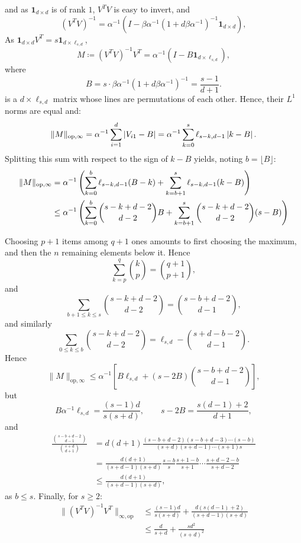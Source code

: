 \documentclass[oneside,UKenglish,a4paper]{amsart}
\numberwithin{equation}{section}
\numberwithin{figure}{section}
\theoremstyle{plain}
\theoremstyle{definition}
\theoremstyle{plain}
\theoremstyle{remark}
\theoremstyle{plain}
\theoremstyle{definition}
\theoremstyle{definition}
\begin{document}
and as $\mathbf{1}_{d\times d}$ is of rank $1$, $V^{T}V$ is easy
to invert, and
\[
(V^{T}V)^{-1}=\alpha^{-1}\left(I-\beta\alpha^{-1}(1+d\beta\alpha^{-1})^{-1}\mathbf{1}_{d\times d}\right),
\]
As $\mathbf{1}_{d\times d}V^{T}=s\mathbf{1}_{d\times\ell_{s,d}}$,
\[
M\coloneqq(V^{T}V)^{-1}V^{T}=\alpha^{-1}\left(I-B\mathbf{1}_{d\times\ell_{s,d}}\right),
\]
where
\[
B=s\cdot\beta\alpha^{-1}(1+d\beta\alpha^{-1})^{-1}=\frac{s-1}{d+1}.
\]
is a $d\times\ell_{s,d}$ matrix whose lines are permutations of each
other. Hence, their $L^{1}$ norms are equal and:
\[
\lVert M\rVert_{\text{op,\ensuremath{\infty}}}=\alpha^{-1}\sum_{i=1}^{d}\left|V_{i1}-B\right|=\alpha^{-1}\sum_{k=0}^{s}\ell_{s-k,d-1}\left|k-B\right|.
\]
Splitting this sum with respect to the sign of $k-B$ yields, noting
$b=\lfloor B\rfloor$:
\begin{align*}
\lVert M\rVert_{\text{op,\ensuremath{\infty}}} & =\alpha^{-1}\left(\sum_{k=0}^{b}\ell_{s-k,d-1}(B-k)+\sum_{k=b+1}^{s}\ell_{s-k,d-1}(k-B)\right)\\
 & \le\alpha^{-1}\left(\sum_{k=0}^{b}\binom{s-k+d-2}{d-2}B+\sum_{k=b+1}^{s}\binom{s-k+d-2}{d-2}(s-B)\right)
\end{align*}

Choosing $p+1$ items among $q+1$ ones amounts to first choosing
the maximum, and then the $n$ remaining elements below it. Hence
\[
\sum_{k=p}^{q}\binom{k}{p}=\binom{q+1}{p+1},
\]
and 
\[
\sum_{b+1\le k\le s}\binom{s-k+d-2}{d-2}=\binom{s-b+d-2}{d-1},
\]
and similarly
\[
\sum_{0\le k\le b}\binom{s-k+d-2}{d-2}=\ell_{s,d}-\binom{s+d-b-2}{d-1}.
\]
Hence
\[
\lVert M\rVert_{\text{op},\infty}\le\alpha^{-1}\left[B\ell_{s,d}+(s-2B)\binom{s-b+d-2}{d-1}\right],
\]
but
\[
B\alpha^{-1}\ell_{s,d}=\frac{(s-1)d}{s(s+d)},\qquad s-2B=\frac{s(d-1)+2}{d+1},
\]
and
\begin{align*}
\frac{\binom{s-b+d-2}{d-1}}{\binom{s+d}{d+1}} & =d(d+1)\frac{(s-b+d-2)(s-b+d-3)\cdots(s-b)}{(s+d)(s+d-1)\cdots(s+1)s}\\
 & =\frac{d(d+1)}{(s+d-1)(s+d)}\frac{s-b}{s}\frac{s+1-b}{s+1}\cdots\frac{s+d-2-b}{s+d-2}\\
 & \le\frac{d(d+1)}{(s+d-1)(s+d)},
\end{align*}
as $b\le s$. Finally, for $s\ge2$:
\begin{align*}
\lVert(V^{T}V)^{-1}V^{T}\rVert_{\infty,\text{op}} & \le\frac{(s-1)d}{s(s+d)}+\frac{d(s(d-1)+2)}{(s+d-1)(s+d)}\\
 & \le\frac{d}{s+d}+\frac{sd^{2}}{(s+d)^{2}}
\end{align*}
\end{document}
